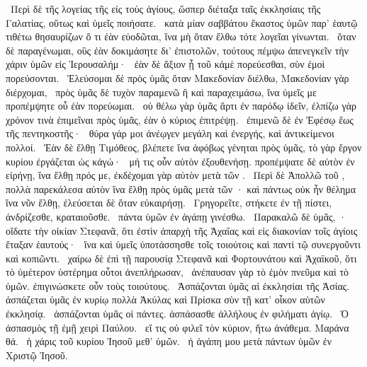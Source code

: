 ~Περὶ δὲ τῆς λογείας τῆς εἰς τοὺς ἁγίους, ὥσπερ διέταξα ταῖς ἐκκλησίαις τῆς Γαλατίας, οὕτως καὶ ὑμεῖς ποιήσατε.
~κατὰ μίαν σαββάτου ἕκαστος ὑμῶν παρ’ ἑαυτῷ τιθέτω θησαυρίζων ὅ τι ἐὰν εὐοδῶται, ἵνα μὴ ὅταν ἔλθω τότε λογεῖαι γίνωνται.
~ὅταν δὲ παραγένωμαι, οὓς ἐὰν δοκιμάσητε δι’ ἐπιστολῶν, τούτους πέμψω ἀπενεγκεῖν τὴν χάριν ὑμῶν εἰς Ἰερουσαλήμ·
~ἐὰν δὲ ἄξιον ᾖ τοῦ κἀμὲ πορεύεσθαι, σὺν ἐμοὶ πορεύσονται.
~Ἐλεύσομαι δὲ πρὸς ὑμᾶς ὅταν Μακεδονίαν διέλθω, Μακεδονίαν γὰρ διέρχομαι,
~πρὸς ὑμᾶς δὲ τυχὸν παραμενῶ ἢ καὶ παραχειμάσω, ἵνα ὑμεῖς με προπέμψητε οὗ ἐὰν πορεύωμαι.
~οὐ θέλω γὰρ ὑμᾶς ἄρτι ἐν παρόδῳ ἰδεῖν, ἐλπίζω γὰρ χρόνον τινὰ ἐπιμεῖναι πρὸς ὑμᾶς, ἐὰν ὁ κύριος ἐπιτρέψῃ.
~ἐπιμενῶ δὲ ἐν Ἐφέσῳ ἕως τῆς πεντηκοστῆς·
~θύρα γάρ μοι ἀνέῳγεν μεγάλη καὶ ἐνεργής, καὶ ἀντικείμενοι πολλοί.
~Ἐὰν δὲ ἔλθῃ Τιμόθεος, βλέπετε ἵνα ἀφόβως γένηται πρὸς ὑμᾶς, τὸ γὰρ ἔργον κυρίου ἐργάζεται ὡς κἀγώ·
~μή τις οὖν αὐτὸν ἐξουθενήσῃ. προπέμψατε δὲ αὐτὸν ἐν εἰρήνῃ, ἵνα ἔλθῃ πρός με, ἐκδέχομαι γὰρ αὐτὸν μετὰ τῶν .
~Περὶ δὲ Ἀπολλῶ τοῦ , πολλὰ παρεκάλεσα αὐτὸν ἵνα ἔλθῃ πρὸς ὑμᾶς μετὰ τῶν · καὶ πάντως οὐκ ἦν θέλημα ἵνα νῦν ἔλθῃ, ἐλεύσεται δὲ ὅταν εὐκαιρήσῃ.
~Γρηγορεῖτε, στήκετε ἐν τῇ πίστει, ἀνδρίζεσθε, κραταιοῦσθε.
~πάντα ὑμῶν ἐν ἀγάπῃ γινέσθω.
~Παρακαλῶ δὲ ὑμᾶς, · οἴδατε τὴν οἰκίαν Στεφανᾶ, ὅτι ἐστὶν ἀπαρχὴ τῆς Ἀχαΐας καὶ εἰς διακονίαν τοῖς ἁγίοις ἔταξαν ἑαυτούς·
~ἵνα καὶ ὑμεῖς ὑποτάσσησθε τοῖς τοιούτοις καὶ παντὶ τῷ συνεργοῦντι καὶ κοπιῶντι.
~χαίρω δὲ ἐπὶ τῇ παρουσίᾳ Στεφανᾶ καὶ Φορτουνάτου καὶ Ἀχαϊκοῦ, ὅτι τὸ ὑμέτερον ὑστέρημα οὗτοι ἀνεπλήρωσαν,
~ἀνέπαυσαν γὰρ τὸ ἐμὸν πνεῦμα καὶ τὸ ὑμῶν. ἐπιγινώσκετε οὖν τοὺς τοιούτους.
~Ἀσπάζονται ὑμᾶς αἱ ἐκκλησίαι τῆς Ἀσίας. ἀσπάζεται ὑμᾶς ἐν κυρίῳ πολλὰ Ἀκύλας καὶ Πρίσκα σὺν τῇ κατ’ οἶκον αὐτῶν ἐκκλησίᾳ.
~ἀσπάζονται ὑμᾶς οἱ  πάντες. ἀσπάσασθε ἀλλήλους ἐν φιλήματι ἁγίῳ.
~Ὁ ἀσπασμὸς τῇ ἐμῇ χειρὶ Παύλου.
~εἴ τις οὐ φιλεῖ τὸν κύριον, ἤτω ἀνάθεμα. Μαράνα θά.
~ἡ χάρις τοῦ κυρίου Ἰησοῦ μεθ’ ὑμῶν.
~ἡ ἀγάπη μου μετὰ πάντων ὑμῶν ἐν Χριστῷ Ἰησοῦ.


